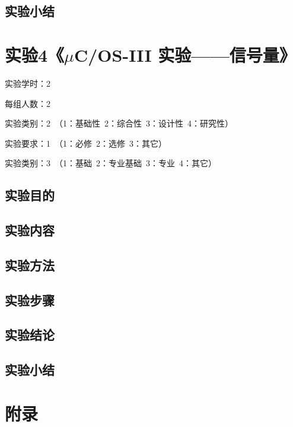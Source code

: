﻿\documentclass[UTF8,12pt]{article}
\begin{document}
\subsection{实验小结}

\newpage

\section{实验4《$\mu$C/OS-III 实验——信号量》}

实验学时：2

每组人数：2

实验类别：2\ （1：基础性\ 2：综合性\ 3：设计性\ 4：研究性）

实验要求：1\ （1：必修\ 2：选修\ 3：其它）

实验类别：3\ （1：基础\ 2：专业基础\ 3：专业\ 4：其它）

\subsection{实验目的}

\subsection{实验内容}

\subsection{实验方法}

\subsection{实验步骤}

\subsection{实验结论}

\subsection{实验小结}


\section{附录}
\end{document}
